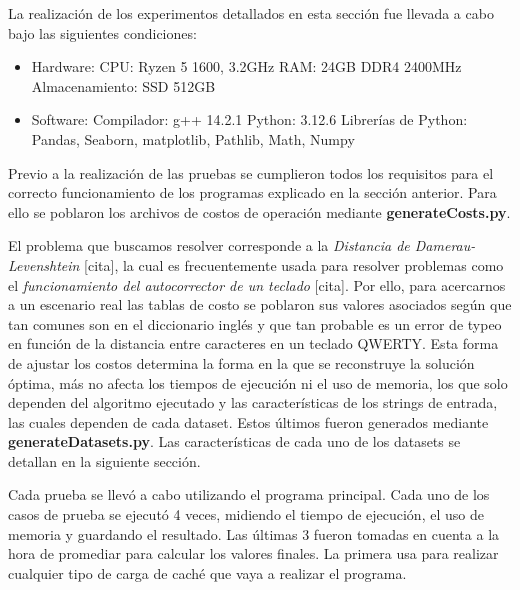 
La realización de los experimentos detallados en esta sección fue llevada a cabo bajo las siguientes condiciones:

\begin{itemize}
    \item Hardware:
    \subitem CPU: Ryzen 5 1600, 3.2GHz
    \subitem RAM: 24GB DDR4 2400MHz
    \subitem Almacenamiento: SSD 512GB
    \item Software:
    \subitem Compilador: g++ 14.2.1
    \subitem Python: 3.12.6
    \subitem Librerías de Python:
    \subsubitem Pandas, Seaborn, matplotlib, Pathlib, Math, Numpy

\end{itemize}

Previo a la realización de las pruebas se cumplieron todos los requisitos para el correcto funcionamiento de los programas 
explicado en la sección anterior. Para ello se poblaron los archivos de costos de operación mediante \textbf{generateCosts.py}.

El problema que buscamos resolver corresponde a la \textit{Distancia de Damerau-Levenshtein} [cita], la cual es frecuentemente usada 
para resolver problemas como el \textit{funcionamiento del autocorrector de un teclado} [cita]. Por ello, para acercarnos a un escenario 
real las tablas de costo se poblaron sus valores asociados según que tan comunes son en el diccionario inglés y que tan probable es un error de typeo 
en función de la distancia entre caracteres en un teclado QWERTY. Esta forma de ajustar los costos determina la forma en la que se reconstruye la 
solución óptima, más no afecta los tiempos de ejecución ni el uso de memoria, los que solo dependen del algoritmo ejecutado y 
las características de los strings de entrada, las cuales dependen de cada dataset. Estos últimos fueron generados mediante \textbf{generateDatasets.py}. 
Las características de cada uno de los datasets se detallan en la siguiente sección.

Cada prueba se llevó a cabo utilizando el programa principal. Cada uno de los casos de prueba se ejecutó 4 veces, midiendo el tiempo de ejecución, el uso de memoria y guardando el resultado. 
Las últimas 3 fueron tomadas en cuenta a la hora de promediar para calcular los valores finales. La primera usa para realizar cualquier tipo de carga de caché que vaya a realizar el programa.

\pagebreak